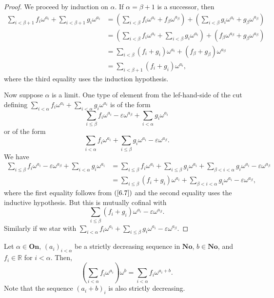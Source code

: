 \begin{proof} We proceed by induction on $\alpha$.  If $\alpha=\beta+1$ is a successor, then
\begin{align*} \sum_{i<\beta+1}f_i\omega^{a_i} + \sum_{i<\beta+1} g_i \omega^{a_i} & = \left ( \sum_{i<\beta} f_i\omega^{a_i} + f_\beta \omega^{a_\beta} \right ) + \left (  \sum_{i<\beta} g_i \omega^{a_i} + g_\beta \omega^{a_\beta} \right ) \\
	& = \left ( \sum_{i<\beta} f_i\omega^{a_i} + \sum_{i<\beta} g_i \omega^{a_i} \right ) + ( f_\beta \omega^{a_\beta} + g_\beta \omega^{a_\beta}) \\
	& = \sum_{i<\beta} (f_i+g_i) \omega^{a_i} + (f_\beta+g_\beta)\omega^{a_\beta} \\
	& = \sum_{i<\beta+1}(f_i+g_i)\omega^{a_i}, \end{align*}
where the third equality uses the induction hypothesis.

Now suppose $\alpha$ is a limit.  One type of element from the lef-hand-side of the cut defining   $\sum_{i<\alpha}f_i\omega^{a_i} + \sum_{i<\alpha} g_i \omega^{a_i}$ is of the form
$$\sum_{i\leq \beta} f_i \omega^{a_i}-\varepsilon  \omega^{a_\beta} +\sum_{i<\alpha} g_i \omega^{a_i}$$
or of the form
$$\sum_{i<\alpha} f_i \omega^{a_i} +\sum_{i\leq \beta} g_i \omega^{a_i} -\varepsilon  \omega^{a_\beta}.$$
We have
\begin{align*} \sum_{i\leq \beta} f_i \omega^{a_i}-\varepsilon  \omega^{a_\beta} +\sum_{i<\alpha} g_i \omega^{a_i} 
 & = \sum_{i\leq \beta} f_i \omega^{a_i} + \sum_{i\leq \beta} g_i \omega^{a_i} + \sum_{\beta< i<\alpha} g_i \omega^{a_i} -\varepsilon  \omega^{a_\beta} \\
  & = \sum_{i\leq \beta}(f_i+g_i)\omega^{a_i} + \sum_{\beta< i<\alpha} g_i \omega^{a_i} -\varepsilon  \omega^{a_\beta}, \end{align*}
  where the first equality follows from $(\ref{6.7})$ and the second equality uses the inductive hypothesis.  But this is mutually cofinal with 
 $$\sum_{i\leq \beta}(f_i+g_i)\omega^{a_i} - \varepsilon \omega^{a_\beta}.$$
 Similarly if we star with $\sum_{i<\alpha} f_i \omega^{a_i} +\sum_{i\leq \beta} g_i \omega^{a_i} -\varepsilon  \omega^{a_\beta}.$
\end{proof}


\begin{lemma} \label{6.8} Let $\alpha \in \textbf{On}$, $(a_i)_{i<\alpha}$ be a strictly decreasing sequence in $\textbf{No}$, $b\in \textbf{No}$, and $f_i\in \mathds{R}$ for $i<\alpha$. Then,
$$\left ( \sum_{i<\alpha} f_i\omega^{a_i} \right ) \omega^b = \sum_{i<\alpha}f_i\omega^{a_i+b}.$$
Note that the sequence $(a_i+b)_i$ is also strictly decreasing.\end{lemma}


